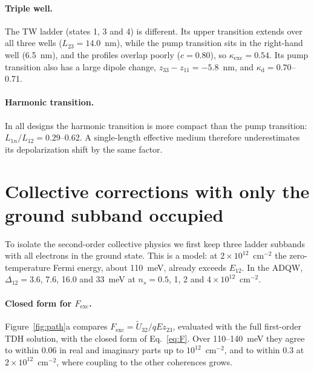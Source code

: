 \documentclass[11pt]{article}
\begin{document}
\paragraph{Triple well.} The TW ladder (states 1, 3 and 4) is different. Its upper transition extends over all three wells ($L_{23}=14.0$~nm), while the pump transition sits in the right-hand well (6.5~nm), and the profiles overlap poorly ($c=0.80$), so $\kappa_\mathrm{exc}=0.54$. Its pump transition also has a large dipole change, $z_{33}-z_{11}=-5.8$~nm, and $\kappa_\mathrm{d}=0.70$--0.71.

\paragraph{Harmonic transition.} In all designs the harmonic transition is more compact than the pump transition: $L_{1n}/L_{12}=0.29$--0.62. A single-length effective medium therefore underestimates its depolarization shift by the same factor.

\section{Collective corrections with only the ground subband occupied}\label{sec:ground}
To isolate the second-order collective physics we first keep three ladder subbands with all electrons in the ground state. This is a model: at $2\times10^{12}$~cm$^{-2}$ the zero-temperature Fermi energy, about 110~meV, already exceeds $E_{12}$. In the ADQW, $\Delta_{12}=3.6$, 7.6, 16.0 and 33~meV at $n_s=0.5$, 1, 2 and $4\times10^{12}$~cm$^{-2}$.

\paragraph{Closed form for $F_\mathrm{exc}$.} Figure~\ref{fig:path}a compares $F_\mathrm{exc}=\tilde U_{32}/qEz_{23}$, evaluated with the full first-order TDH solution, with the closed form of Eq.~\eqref{eq:F}. Over 110--140~meV they agree to within 0.06 in real and imaginary parts up to $10^{12}$~cm$^{-2}$, and to within 0.3 at $2\times10^{12}$~cm$^{-2}$, where coupling to the other coherences grows.
\end{document}
